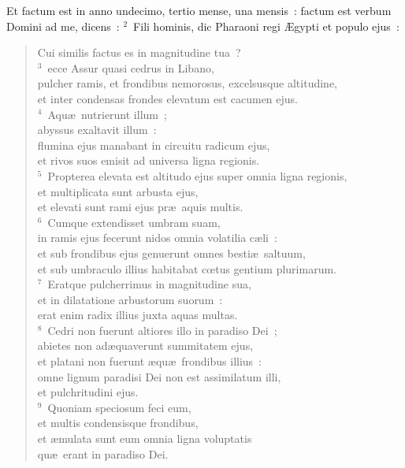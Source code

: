 \lettrine[lines=10,image=true,loversize=0.05,lraise=-0.03]{E}{}t factum est in anno undecimo, tertio mense, una mensis~: factum est verbum Domini ad me, dicens~:
${}^{2}$~Fili hominis, dic Pharaoni regi \AE gypti et populo ejus~: \begin{flushleft}\begin{verse}Cui similis factus es in magnitudine tua~?\\
${}^{3}$~ecce Assur quasi cedrus in Libano,\\ pulcher ramis, et frondibus nemorosus, excelsusque altitudine,\\ et inter condensas frondes elevatum est cacumen ejus.\\
${}^{4}$~Aqu\ae\ nutrierunt illum~;\\ abyssus exaltavit illum~:\\ flumina ejus manabant in circuitu radicum ejus,\\ et rivos suos emisit ad universa ligna regionis.\\
${}^{5}$~Propterea elevata est altitudo ejus super omnia ligna regionis,\\ et multiplicata sunt arbusta ejus,\\ et elevati sunt rami ejus pr\ae\ aquis multis.\\
${}^{6}$~Cumque extendisset umbram suam,\\ in ramis ejus fecerunt nidos omnia volatilia c\ae li~:\\ et sub frondibus ejus genuerunt omnes besti\ae\ saltuum,\\ et sub umbraculo illius habitabat cœtus gentium plurimarum.\\
${}^{7}$~Eratque pulcherrimus in magnitudine sua,\\ et in dilatatione arbustorum suorum~:\\ erat enim radix illius juxta aquas multas.\\
${}^{8}$~Cedri non fuerunt altiores illo in paradiso Dei~;\\ abietes non ad\ae quaverunt summitatem ejus,\\ et platani non fuerunt \ae qu\ae\ frondibus illius~:\\ omne lignum paradisi Dei non est assimilatum illi,\\ et pulchritudini ejus.\\
${}^{9}$~Quoniam speciosum feci eum,\\ et multis condensisque frondibus,\\ et \ae mulata sunt eum omnia ligna voluptatis\\ qu\ae\ erant in paradiso Dei.\end{verse}\end{flushleft}


